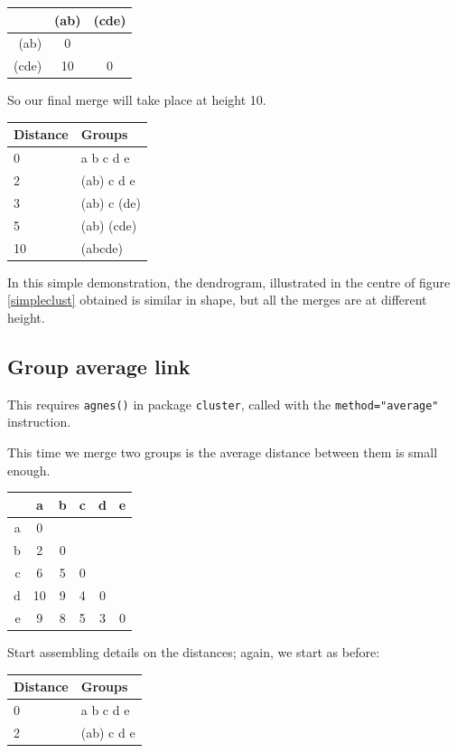 \begin{minipage}[c]{0.5\textwidth}
\begin{tabular}{r|cc}
 & (ab) & (cde)\\
\hline
(ab)  & 0   &     \\
(cde) & 10 &  0  \\
\end{tabular}
\end{minipage}
\begin{minipage}[c]{0.5\textwidth}
So our final merge will take place at height 10.

\begin{tabular}{ll}
Distance & Groups\\
\hline
0 & a b c d e\\
2 & (ab) c d e\\
3 & (ab) c (de)\\
5 & (ab) (cde)\\
10 & (abcde)
\end{tabular}
\end{minipage}

In this simple demonstration, the dendrogram, illustrated in the centre of figure \ref{simpleclust} obtained is similar in shape, but all the merges are at different height.  


\subsection{Group average link}

This requires \texttt{agnes()} in package \texttt{cluster}, called with the \verb+method="average"+ instruction.

This time we merge two groups is the average distance between them is small enough.

\begin{minipage}[c]{0.5\textwidth}
\begin{tabular}{r|ccccc}
 & a & b & c & d & e\\
\hline
a & 0  &   &   &   &\\
b & 2  & 0 &   &   &\\
c & 6  & 5 & 0 &   & \\
d & 10 & 9 & 4 & 0 &  \\
e & 9  & 8 & 5 & 3 & 0\\
\end{tabular}
\end{minipage}
\begin{minipage}[c]{0.5\textwidth}
Start assembling details on the distances; again, we start as before:
\begin{tabular}{ll}
Distance & Groups\\
\hline
0 & a b c d e\\
2 & (ab) c d e
\end{tabular}
\end{minipage}

